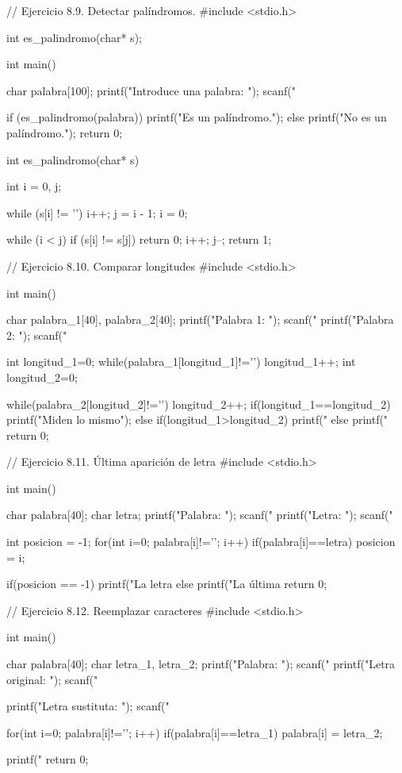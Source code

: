 \par\vfill\null\pagebreak

// Ejercicio 8.9. Detectar palíndromos.
#include <stdio.h>

int es_palindromo(char* s);

int main() {
   char palabra[100];
   printf("Introduce una palabra: ");
   scanf("%
   
   if (es_palindromo(palabra)) {
      printf("Es un palíndromo.\n");
   } else {
      printf("No es un palíndromo.\n");
   }
   return 0;
}  

int es_palindromo(char* s) {
   int i = 0, j;
   
   while (s[i] != '\0') {
      i++;
   } 
   j = i - 1; i = 0;
   
   while (i < j) {
      if (s[i] != s[j]) {
         return 0;
      } 
      i++; j--;
   }
   return 1;
}


// Ejercicio 8.10. Comparar longitudes
#include <stdio.h>

int main() {
   char palabra_1[40], palabra_2[40];
   printf("Palabra 1: ");
   scanf("%
   printf("Palabra 2: ");
   scanf("%
   
   int longitud_1=0;
   while(palabra_1[longitud_1]!='\0') {
      longitud_1++;
   }
   int longitud_2=0;


   
   while(palabra_2[longitud_2]!='\0') {
      longitud_2++;
   }   
   if(longitud_1==longitud_2) {
      printf("Miden lo mismo\n");
   } else if(longitud_1>longitud_2) {
      printf("%
   } else {
      printf("%
   }  
   return 0;
}  


// Ejercicio 8.11. Última aparición de letra
#include <stdio.h>

int main() {
   char palabra[40];
   char letra;
   printf("Palabra: ");
   scanf("%
   printf("Letra: ");
   scanf(" %
   
   int posicion = -1;
   for(int i=0; palabra[i]!='\0'; i++) {
      if(palabra[i]==letra) {
         posicion = i;
      }
   }
   
   if(posicion == -1) {
      printf("La letra %
   } else {
      printf("La última %
   }
   return 0;
}  


// Ejercicio 8.12. Reemplazar caracteres
#include <stdio.h>

int main() {
   char palabra[40];
   char letra_1, letra_2;
   printf("Palabra: ");
   scanf("%
   printf("Letra original: "); 
   scanf(" %



   printf("Letra sustituta: ");
   scanf(" %
   
   for(int i=0; palabra[i]!='\0'; i++) {
      if(palabra[i]==letra_1) {
         palabra[i] = letra_2;
      }
   }
 
   printf("%
   return 0;
}  